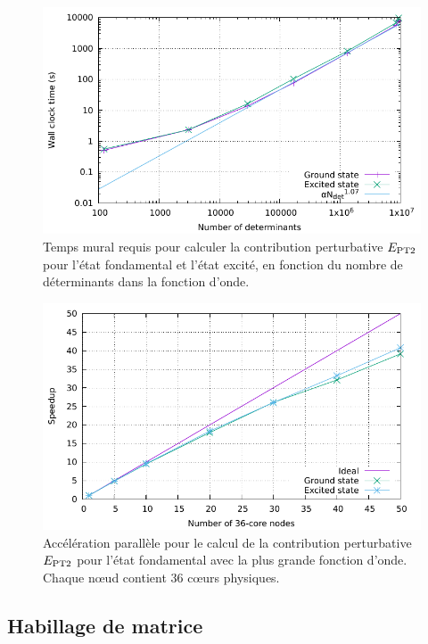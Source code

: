 \documentclass[./thesis.tex]{subfiles}
\begin{document}
\begin{figure}[h!]
        \begin{center}
                \includegraphics[width=0.8\columnwidth]{figures/perf/scaling_pt2_det}
                \caption{Temps mural requis pour calculer la contribution perturbative $E_\text{PT2}$ pour l'état fondamental et l'état excité, en fonction du nombre de déterminants dans la fonction d'onde.            }
                \label{fig:scaling_det_pt2_fr}
        \end{center}
\end{figure}
\begin{figure}[hbt!]
        \begin{center}
                \includegraphics[width=0.8\columnwidth]{figures/perf/scaling_pt2_node}
                \caption{Accélération parallèle pour le calcul de la contribution perturbative $E_\text{PT2}$ pour l'état fondamental avec la plus grande fonction d'onde. Chaque nœud contient 36 cœurs physiques.               }
                \label{fig:scaling_node_pt2_fr}
        \end{center}
\end{figure}
\subsection{Habillage de matrice}
\end{document}

